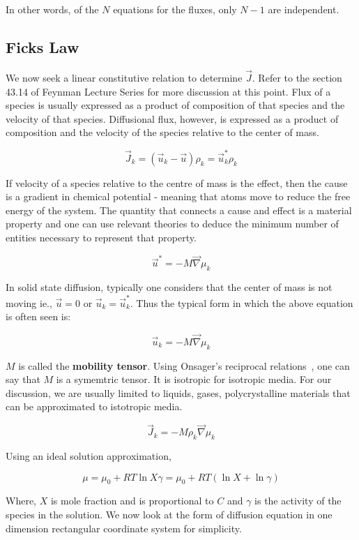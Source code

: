 In other words, of the $N$ equations for the fluxes, only $N-1$ are independent.

\subsection{Ficks Law}

We now seek a linear constitutive relation to determine $\vec{J}$. Refer to the
section 43.14 of Feynman Lecture Series for more discussion at this point. Flux
of a species is usually expressed as a product of composition of that species
and the velocity of that species. Diffusional flux, however, is expressed as a product of composition and the velocity of the species relative to the center of mass.

$$ \vec{J}_k = (\vec{u}_k - \vec{u}) \rho_k = \vec{u}^*_k \rho_k $$


If velocity of a species relative to the centre of mass is the effect, 
then the cause is a gradient in chemical potential - meaning that atoms move to
reduce the free energy of the system. The quantity that connects  a cause and 
effect is a material property and one can use relevant theories to deduce 
the minimum number of entities necessary to represent that property.

$$ \vec{u}^* = - M \vec{\nabla} \mu_k $$

In solid state diffusion, typically one considers that the center of mass is not moving ie., $\vec{u} = 0$ or 
$\vec{u}_k = \vec{u}^*_k$. Thus the typical form in which the above equation is often seen is:

$$ \vec{u}_k  = - M \vec{\nabla} \mu_k $$

$M$ is called the \textbf{mobility tensor}. Using Onsager's reciprocal
relations~\cite{onsager1, onsager2}, one can say that $M$ is a symemtric tensor.
It is isotropic for isotropic media. For our discussion, we are usually limited
to liquids, gases, polycrystalline materials that can be approximated to
istotropic media.

$$ \vec{J}_k = -M \rho_k \vec{\nabla} \mu_k $$

Using an ideal solution approximation,

$$\mu = \mu_0 + RT \ln {X\gamma} = \mu_0 + RT \left( \ln X  + \ln \gamma
\right)$$

Where, $X$ is mole fraction and is proportional to $C$ and $\gamma$ is the
activity of the species in the solution. 
We now look at the form of diffusion equation in one dimension rectangular coordinate system for simplicity.

